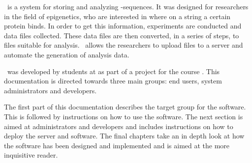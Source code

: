 

\appName\ is a system for storing and analyzing -sequences. It was designed for researchers in the field of epigenetics, who are interested in where on a  string a certain protein binds. In order to get this information, experiments are conducted and  data files collected. These data files are then converted, in a series of steps, to files suitable for analysis. \appName\ allows the researchers to upload  files to a server and automate the generation of analysis data. 

\appName\ was developed by students at  as part of a project for the course . This documentation is directed towards three main groups: end users, system administrators and developers.

The first part of this documentation describes the target group for the software. This is followed by instructions on how to use the software. The next section is aimed at administrators and developers and includes instructions on how to deploy the server and software. The final chapters take an in depth look at how the software has been designed and implemented and is aimed at the more inquisitive reader. 

